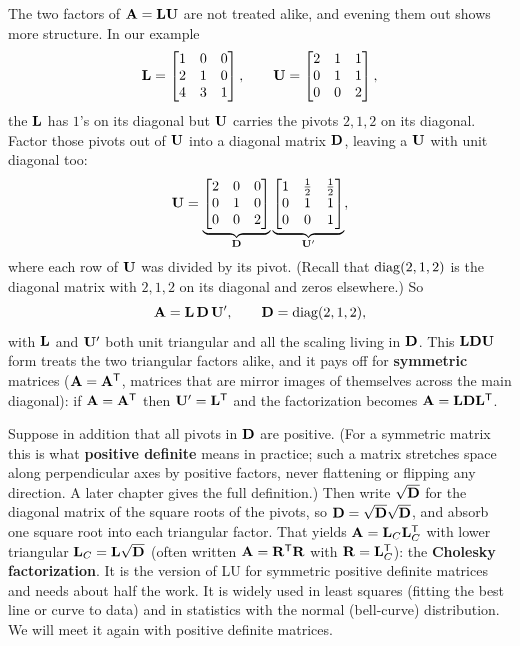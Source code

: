 The two factors of $\mathbf{A}=\mathbf{L}\mathbf{U}$ are not treated alike, and evening them out
shows more structure. In our example
\[
  \mathbf{L} = \begin{bmatrix} 1&0&0\\2&1&0\\4&3&1 \end{bmatrix}, \qquad
  \mathbf{U} = \begin{bmatrix} 2&1&1\\0&1&1\\0&0&2 \end{bmatrix},
\]
the $\mathbf{L}$ has $1$'s on its diagonal but $\mathbf{U}$ carries the pivots $2,1,2$ on its
diagonal. Factor those pivots out of $\mathbf{U}$ into a diagonal matrix $\mathbf{D}$, leaving a
$\mathbf{U}$ with unit diagonal too:
\[
  \mathbf{U} = \underbrace{\begin{bmatrix} 2&0&0\\0&1&0\\0&0&2 \end{bmatrix}}_{\mathbf{D}}
            \underbrace{\begin{bmatrix} 1 & \tfrac12 & \tfrac12 \\ 0 & 1 & 1 \\ 0 & 0 & 1 \end{bmatrix}}_{\mathbf{U}'},
\]
where each row of $\mathbf{U}$ was divided by its pivot. (Recall that $\operatorname{diag}(2,1,2)$ is the
diagonal matrix with $2,1,2$ on its diagonal and zeros elsewhere.) So
\[
  \mathbf{A} = \mathbf{L}\,\mathbf{D}\,\mathbf{U}', \qquad
  \mathbf{D}=\operatorname{diag}(2,1,2),
\]
with $\mathbf{L}$ and $\mathbf{U}'$ both unit triangular and all the scaling living in $\mathbf{D}$.
This $\mathbf{L}\mathbf{D}\mathbf{U}$ form treats the two triangular factors alike, and it
pays off for \textbf{symmetric} matrices ($\mathbf{A} = \mathbf{A}^{\mathsf{T}}$, matrices that are mirror
images of themselves across the main diagonal): if $\mathbf{A}=\mathbf{A}^{\mathsf{T}}$ then
$\mathbf{U}'=\mathbf{L}^{\mathsf{T}}$ and the factorization becomes $\mathbf{A}=\mathbf{L}\mathbf{D}\mathbf{L}^{\mathsf{T}}$.

Suppose in addition that all pivots in $\mathbf{D}$ are positive. (For a symmetric matrix this
is what \textbf{positive definite} means in practice; such a matrix stretches space along
perpendicular axes by positive factors, never flattening or flipping any direction. A later
chapter gives the full definition.) Then write $\sqrt{\mathbf{D}}$ for the diagonal matrix of
the square roots of the pivots, so $\mathbf{D}=\sqrt{\mathbf{D}}\sqrt{\mathbf{D}}$, and absorb one
square root into each triangular factor.
That yields $\mathbf{A}=\mathbf{L}_C\mathbf{L}_C^{\mathsf{T}}$ with lower triangular
$\mathbf{L}_C = \mathbf{L}\sqrt{\mathbf{D}}$ (often written $\mathbf{A}=\mathbf{R}^{\mathsf{T}}\mathbf{R}$ with
$\mathbf{R}=\mathbf{L}_C^{\mathsf{T}}$): the \textbf{Cholesky factorization}. It is the version of LU for
symmetric positive definite matrices and needs about half the work. It is widely used in
least squares (fitting the best line or curve to data) and in statistics with the normal
(bell-curve) distribution. We will meet it again with positive definite matrices.

